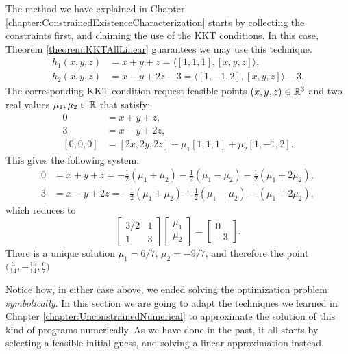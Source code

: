 \begin{example}
The method we have explained in Chapter \ref{chapter:ConstrainedExistenceCharacterization} starts by collecting the constraints first, and claiming the use of the KKT conditions.  In this case, Theorem \ref{theorem:KKTAllLinear} guarantees we may use this technique.
\begin{align*}
h_1(x,y,z) &= x+y+z = \langle [1,1,1], [x,y,z]\rangle, \\
h_2(x,y,z) &= x-y+2z-3 = \langle [1,-1,2],[x,y,z] \rangle -3.
\end{align*}
The corresponding KKT condition request feasible points $(x,y,z) \in \mathbb{R}^3$ and two real values $\mu_1, \mu_2 \in \mathbb{R}$ that satisfy:
\begin{align*}
0 &= x+y+z, \\
3 &= x-y+2z, \\
[0,0,0] &= [2x,2y, 2z] + \mu_1 [1,1,1] + \mu_2 [1,-1,2].
\end{align*}
This gives the following system:
\begin{align*}
0 &= x+y+z = -\tfrac{1}{2}(\mu_1+\mu_2) -\tfrac{1}{2}(\mu_1-\mu_2) -\tfrac{1}{2}(\mu_1+2\mu_2), \\
3 &= x-y+2z = -\tfrac{1}{2}(\mu_1+\mu_2) + \tfrac{1}{2}(\mu_1-\mu_2) - (\mu_1+2\mu_2),
\end{align*}
which reduces to 
\begin{equation*}
\begin{bmatrix}  3/2 & 1 \\ 1 & 3 \end{bmatrix} \begin{bmatrix} \mu_1 \\ \mu_2 \end{bmatrix} = \begin{bmatrix} 0 \\ -3 \end{bmatrix}.
\end{equation*}
There is a unique solution $\mu_1 = 6/7$, $\mu_2 = -9/7$, and therefore the point $\big( \tfrac{3}{14}, -\tfrac{15}{14}, \tfrac{6}{7} \big)$
\end{example}

\separator

Notice how, in either case above, we ended solving the optimization problem \emph{symbolically}.  In this section we are going to adapt the techniques we learned in Chapter \ref{chapter:UnconstrainedNumerical} to approximate the solution of this kind of programs numerically.  As we have done in the past, it all starts by selecting a feasible initial guess, and solving a linear approximation instead.

